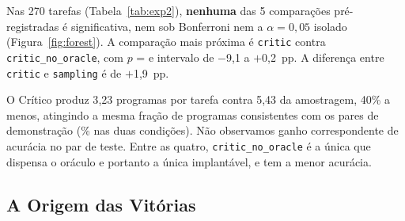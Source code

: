 \documentclass[letterpaper]{article} %
\newcommand{\numComparacoes}{5}
\newcommand{\An}{270}
\newcommand{\AsampProg}{5{,}43} \newcommand{\AcritProg}{3{,}23}
\newcommand{\AreducaoProg}{40}
\newcommand{\AdeltaCritSamp}{\mbox{$+$1{,}9}}
\newcommand{\CquatroLo}{\mbox{$-$9{,}1}}\newcommand{\CquatroHi}{\mbox{$+$0{,}2}}
\newcommand{\vereditoDois}{\textbf{nenhuma} das \numComparacoes{} comparações
pré-registradas é significativa}
\begin{document}
Nas \An{} tarefas (Tabela~\ref{tab:exp2}), \vereditoDois{}, nem sob Bonferroni
nem a $\alpha = 0{,}05$ isolado (Figura~\ref{fig:forest}). A comparação mais
próxima é \texttt{critic} contra \texttt{critic\_no\_oracle}, com
$p$ = \Cquatrop{} e intervalo de \CquatroLo{} a \CquatroHi~pp. A diferença entre
\texttt{critic} e \texttt{sampling} é de \AdeltaCritSamp~pp.

O Crítico produz \AcritProg{} programas por tarefa contra \AsampProg{} da
amostragem, \AreducaoProg\% a menos, atingindo a mesma fração de programas
consistentes com os pares de demonstração (\AcritTreino\% nas duas condições).
Não observamos ganho correspondente de acurácia no par de teste. Entre as quatro,
\texttt{critic\_no\_oracle} é a única que dispensa o oráculo e portanto a única
implantável, e tem a menor acurácia.

\subsection{A Origem das Vitórias}
\end{document}

